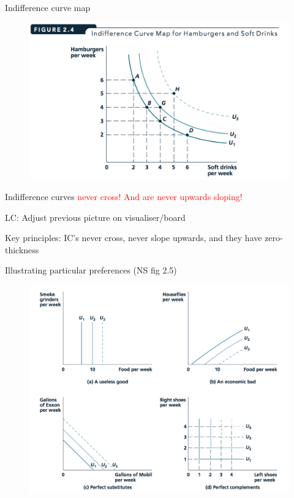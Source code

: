\documentclass[table]{beamer}
\begin{document}
\begin{frame}

\begin{block}{Indifference curve map}

\begin{figure}

{\centering \includegraphics[width=0.9\linewidth]{picsfigs/indifcurvemap} 

}

\end{figure}

Indifference curves \textcolor{red}{never cross!}
\textcolor{red}{And are never upwards sloping!}

LC: Adjust previous picture on visualiser/board

Key principles: IC's never cross, never slope upwards, and they have
zero-thickness

\end{block}

\begin{block}{Illustrating particular preferences (NS fig 2.5)}

\begin{figure}

{\centering \includegraphics[width=0.7\linewidth]{picsfigs/particularpreferences} 

}
\end{figure}
\end{block}
\end{frame}
\end{document}

